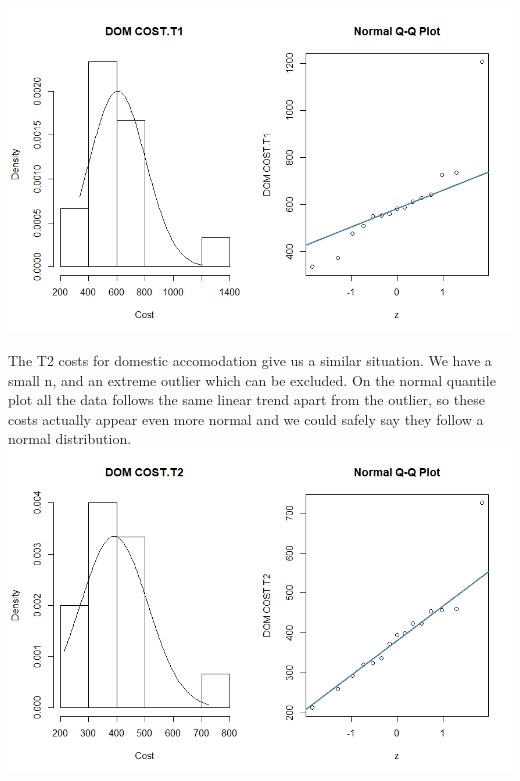 \documentclass[]{article}
\begin{document}
\centering
\includegraphics[width=\textwidth]{RStudio/jpeg/Norm_DOM_T1.jpeg}
\raggedright

The T2 costs for domestic accomodation give us a similar situation. We have a small n, and an extreme outlier which can be excluded. On the normal quantile plot all the data follows the same linear trend apart from the outlier, so these costs actually appear even more normal and we could safely say they follow a normal distribution.
\centering
\includegraphics[width=\textwidth]{RStudio/jpeg/Norm_DOM_T2.jpeg}
\raggedright
\end{document}
